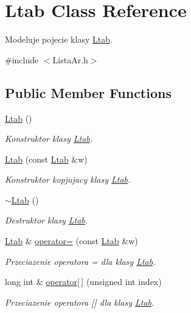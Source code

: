 \hypertarget{class_ltab}{\section{Ltab Class Reference}
\label{class_ltab}
}


Modeluje pojecie klasy \hyperlink{class_ltab}{Ltab}.  




{\ttfamily \#include $<$Lista\-Ar.\-h$>$}

\subsection*{Public Member Functions}
\begin{DoxyCompactItemize}
\item 
\hyperlink{class_ltab_ab6cfd85d06ae19d676c3057dcd119541}{Ltab} ()
\begin{DoxyCompactList}\small\item\em Konstruktor klasy \hyperlink{class_ltab}{Ltab}. \end{DoxyCompactList}\item 
\hyperlink{class_ltab_a964bb07c6108ab0bcd31e4ae7d8ea35a}{Ltab} (const \hyperlink{class_ltab}{Ltab} \&w)
\begin{DoxyCompactList}\small\item\em Konstruktor kopjujacy klasy \hyperlink{class_ltab}{Ltab}. \end{DoxyCompactList}\item 
\hyperlink{class_ltab_af01a96400af8f3988c8a2800ce0eae22}{$\sim$\-Ltab} ()
\begin{DoxyCompactList}\small\item\em Destruktor klasy \hyperlink{class_ltab}{Ltab}. \end{DoxyCompactList}\item 
\hyperlink{class_ltab}{Ltab} \& \hyperlink{class_ltab_a174a5a31161a157d7724e560b99ad170}{operator=} (const \hyperlink{class_ltab}{Ltab} \&w)
\begin{DoxyCompactList}\small\item\em Przeciazenie operatora = dla klasy \hyperlink{class_ltab}{Ltab}. \end{DoxyCompactList}\item 
long int \& \hyperlink{class_ltab_a7744e59f4a4d449c49abd3d80ea1036c}{operator\mbox{[}$\,$\mbox{]}} (unsigned int index)
\begin{DoxyCompactList}\small\item\em Przeciazenie operatora \mbox{[}\mbox{]} dla klasy \hyperlink{class_ltab}{Ltab}. \end{DoxyCompactList}\item 

\end{DoxyCompactItemize}

